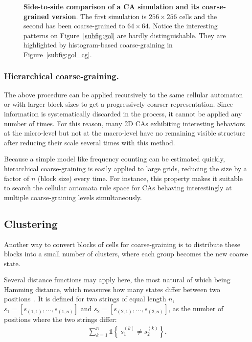 \begin{figure}[th]
  \caption{\label{fig:gol_comparison}\textbf{Side-to-side comparison of a CA
      simulation and its coarse-grained version}. The first simulation is $256
    \times 256$ cells and the second has been coarse-grained to $64\times 64$.
    Notice the interesting patterns on Figure~\ref{subfig:gol} are hardly
    distinguishable. They are highlighted by histogram-based coarse-graining in
    Figure~\ref{subfig:gol_cg}.}
\end{figure}


\subsubsection{Hierarchical coarse-graining.}
The above procedure can be applied recursively to the same cellular automaton or
with larger block sizes to get a progressively coarser representation. Since
information is systematically discarded in the process, it cannot be applied any
number of times. For this reason, many 2D CAs exhibiting interesting behaviors at
the micro-level but not at the macro-level have no remaining visible structure
after reducing their scale several times with this method.

Because a simple model like frequency counting can be estimated quickly,
hierarchical coarse-graining is easily applied to large grids, reducing the size
by a factor of $n$ (block size) every time. For instance, this property makes it
suitable to search the cellular automata rule space for CAs behaving
interestingly at multiple coarse-graining levels simultaneously.

\subsection{Clustering}

Another way to convert blocks of cells for coarse-graining is to distribute
these blocks into a small number of clusters, where each group becomes the new
coarse state.

Several distance functions may apply here, the most natural of which being
Hamming distance, which measures how many states differ between two
positions~\parencite{hammingErrorDetectingError1950}. It is defined for two strings
of equal length $n$, $s_1 = [s_{(1, 1)}, \ldots, s_{(1,n)}]$ and $s_2 =
[s_{(2,1)}, \ldots, s_{(2,n)}]$, as the number of positions where the two
strings differ:
\begin{align}
  \sum_{k = 1}^n \mathds{1}\left\{\ s_1^{(k)}  \neq s_2^{(k)}\right\}.
\end{align}

